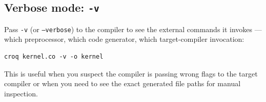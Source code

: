\subsection*{Verbose mode: \texttt{-v}}

Pass \texttt{-v} (or \texttt{--verbose}) to the compiler to see the external commands it invokes --- which preprocessor, which code generator, which target-compiler invocation:

\begin{lstlisting}[language={},caption={Verbose mode: -v}]
croq kernel.co -v -o kernel
\end{lstlisting}

This is useful when you suspect the compiler is passing wrong flags to the target compiler or when you need to see the exact generated file paths for manual inspection.
